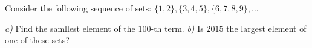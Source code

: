 Consider the following sequence of sets: $ \{ 1,2\} ,\{ 3,4,5\}, \{ 6,7,8,9\} ,... $

\textit{a)} Find the samllest element of the $ 100\text{-th} $ term.
\textit{b)} Is $ 2015 $ the largest element of one of these sets?